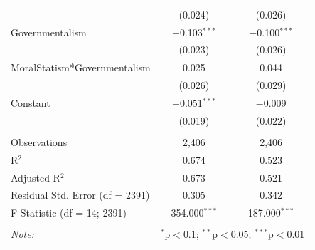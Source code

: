 \documentclass[12pt,]{article}
\begin{document}
\begin{table}[!htbp]
\begin{tabular}{@{\extracolsep{5pt}}lcc}
  & (0.024) & (0.026) \\ 
  Governmentalism & $-$0.103$^{***}$ & $-$0.100$^{***}$ \\ 
  & (0.023) & (0.026) \\ 
  MoralStatism*Governmentalism & 0.025 & 0.044 \\ 
  & (0.026) & (0.029) \\ 
  Constant & $-$0.051$^{***}$ & $-$0.009 \\ 
  & (0.019) & (0.022) \\ 
 \hline \\[-1.8ex] 
Observations & 2,406 & 2,406 \\ 
R$^{2}$ & 0.674 & 0.523 \\ 
Adjusted R$^{2}$ & 0.673 & 0.521 \\ 
Residual Std. Error (df = 2391) & 0.305 & 0.342 \\ 
F Statistic (df = 14; 2391) & 354.000$^{***}$ & 187.000$^{***}$ \\ 
\hline 
\hline \\[-1.8ex] 
\textit{Note:}  & \multicolumn{2}{r}{$^{*}$p$<$0.1; $^{**}$p$<$0.05; $^{***}$p$<$0.01} \\ 
\end{tabular} 
\end{table}

\clearpage
\end{document}
